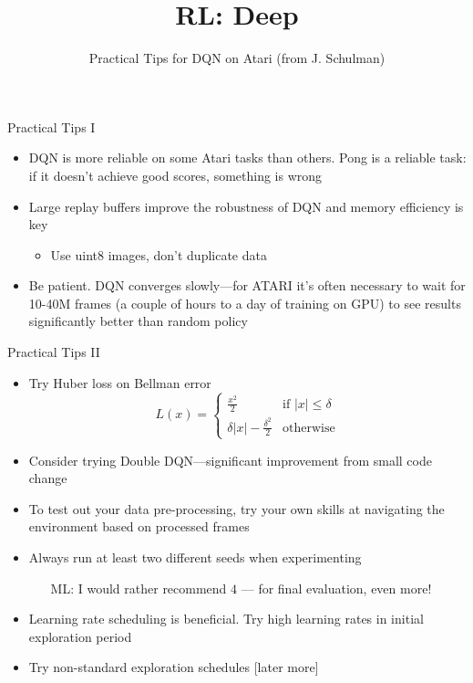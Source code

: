 \documentclass[aspectratio=169]{../latex_main/tntbeamer}  %
\title[RL: Deep Reinforcement Learning]{RL: Deep}
\subtitle{Practical Tips for DQN on Atari (from J. Schulman)}
\begin{document}
	
	\maketitle

\begin{frame}[c]{Practical Tips I}
	
	\begin{itemize}
		\item DQN is more reliable on some Atari tasks than others. Pong is a
		reliable task: if it doesn’t achieve good scores, something is wrong
		\item Large replay buffers improve the robustness of DQN and memory
		efficiency is key
		\begin{itemize}
			\item Use uint8 images, don’t duplicate data
		\end{itemize}
		\item Be patient. DQN converges slowly—for ATARI it’s often necessary to
		wait for 10-40M frames (a couple of hours to a day of training on GPU)
		to see results significantly better than random policy
	\end{itemize}
	
\end{frame}
\begin{frame}[c]{Practical Tips II}
	
	\begin{itemize}
		\item Try Huber loss on Bellman error
		$$L(x) =  \begin{cases}
		\frac{x^2}{2} & \text{if } |x| \leq \delta\\
		\delta |x| - \frac{\delta^2}{2} & \text{otherwise}
		\end{cases}
		$$
		\item Consider trying Double DQN—significant improvement from small
		code change 
		\item To test out your data pre-processing, try your own skills at navigating
		the environment based on processed frames
		\item Always run at least two different seeds when experimenting
		\begin{itemize}
			\item [ML:] I would rather recommend $4$ --- for final evaluation, even more!
		\end{itemize}
		\item Learning rate scheduling is beneficial. Try high learning rates in initial
		exploration period
		\item Try non-standard exploration schedules [later more]
	\end{itemize}
	
\end{frame}
\end{document}
